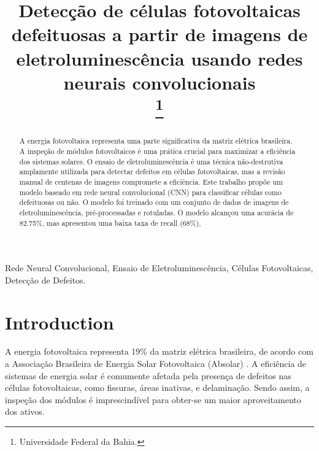 \documentclass[conference]{IEEEtran}
\begin{document}
\title{Detecção de células fotovoltaicas defeituosas a partir de imagens de
    eletroluminescência usando redes neurais convolucionais\\
    \thanks{Universidade Federal da Bahia.}
}

\author{
}

\maketitle

\begin{abstract}
    A energia fotovoltaica representa uma parte significativa da matriz
    elétrica brasileira. A inspeção de módulos fotovoltaicos é uma prática
    crucial para maximizar a eficiência dos sistemas solares. O ensaio de
    eletroluminescência é
    uma técnica não-destrutiva amplamente utilizada para detectar defeitos em
    células fotovoltaicas, mas a revisão manual de centenas de imagens
    compromete a eficiência. Este trabalho propõe um modelo baseado em rede
    neural convolucional (CNN) para classificar células como defeituosas ou
    não. O modelo foi treinado com um conjunto de dados de imagens de
    eletroluminescência, pré-processadas e rotuladas. O modelo alcançou uma
    acurácia de 82.75\%, mas apresentou uma baixa taxa de recall (68\%),
\end{abstract}

\begin{IEEEkeywords}
    Rede Neural Convolucional, Ensaio de Eletroluminescência, Células
    Fotovoltaicas, Detecção de Defeitos.
\end{IEEEkeywords}

\section{Introduction}
A energia fotovoltaica representa 19\% da matriz elétrica brasileira, de
acordo com a Associação Brasileira de Energia Solar Fotovoltaica (Absolar)
\cite{absolar2024}. A eficiência de sistemas de energia solar é comumente
afetada pela presença de defeitos nas células fotovoltaicas, como fissuras,
áreas inativas, e delaminação. Sendo assim, a inspeção dos módulos
é imprescindível para obter-se um maior aproveitamento dos ativos.
\end{document}
